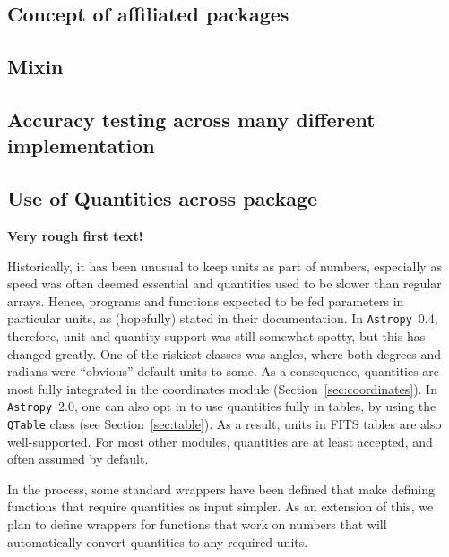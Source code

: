 \documentclass[modern]{aastex61}
\newcommand{\package}[1]{\texttt{#1}}
\newcommand{\astropypkg}{\package{Astropy}}
\newcommand{\sectionname}{Section}
\begin{document}
\subsection{Concept of affiliated packages}

\subsection{Mixin}

\subsection{Accuracy testing across many different implementation}

\subsection{Use of Quantities across package}

{\bf Very rough first text!}

Historically, it has been unusual to keep units as part of numbers, especially as speed was often deemed essential and quantities used to be slower than regular arrays. Hence, programs and functions expected to be fed parameters in particular units, as (hopefully) stated in their documentation.  In \astropypkg\ 0.4, therefore, unit and quantity support was still somewhat spotty, but this has changed greatly.  One of the riskiest classes was angles, where both degrees and radians were ``obvious'' default units to some. As a consequence, quantities are most fully integrated in the coordinates module (\sectionname~\ref{sec:coordinates}). In \astropypkg\ 2.0, one can also opt in to use quantities fully in tables, by using the {\tt QTable} class (see \sectionname~\ref{sec:table}). As a result, units in FITS tables are also well-supported. For most other modules, quantities are at least accepted, and often assumed by default.

In the process, some standard wrappers have been defined that make defining functions that require quantities as input simpler. As an extension of this, we plan to define wrappers for functions that work on numbers that will automatically convert quantities to any required units.
\end{document}
